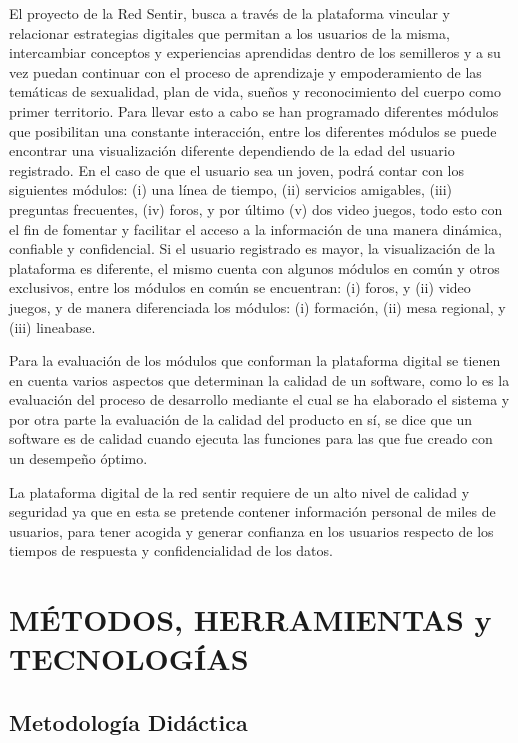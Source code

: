 \documentclass[journal,transmag]{IEEEtran}
\begin{document}
El proyecto de la Red Sentir, busca a través de la plataforma vincular y relacionar estrategias digitales que permitan a los usuarios de la misma, intercambiar conceptos y experiencias aprendidas dentro de los semilleros y a su vez puedan continuar con el proceso de aprendizaje y empoderamiento de las temáticas de sexualidad, plan de vida, sueños y reconocimiento del cuerpo como primer territorio. Para llevar esto a cabo se han programado diferentes módulos que posibilitan una constante interacción, entre los diferentes módulos se puede encontrar una visualización diferente dependiendo de la edad del usuario registrado. 
En el caso de que el usuario sea un joven, podrá contar con los siguientes módulos: (i) una línea de tiempo, (ii) servicios amigables, (iii) preguntas frecuentes, (iv) foros, y por último (v) dos video juegos, todo esto con el fin de fomentar y facilitar el acceso a la información de una manera dinámica, confiable y confidencial. Si el usuario registrado es mayor, la visualización de la plataforma es diferente, el mismo cuenta con algunos módulos en común y otros exclusivos, entre los módulos en común se encuentran: (i) foros, y (ii) video juegos, y de manera diferenciada los módulos:  (i) formación, (ii) mesa regional, y (iii) lineabase.

Para la evaluación de los módulos que conforman la plataforma digital se tienen en cuenta varios aspectos que determinan la calidad de un software, como lo es la evaluación del proceso de desarrollo mediante el cual se ha elaborado el sistema y por otra parte la evaluación de la calidad del producto en sí, se dice que un software es de calidad cuando ejecuta las funciones para las que fue creado con un desempeño óptimo.

La plataforma digital de la red sentir requiere de un alto nivel de calidad y seguridad ya que en esta se pretende contener información personal de miles de usuarios, para tener acogida y generar confianza en los usuarios respecto de los tiempos de respuesta y confidencialidad de los datos.

\section{MÉTODOS, HERRAMIENTAS y TECNOLOGÍAS}\label{sec:herramientas}

\subsection{Metodología Didáctica}
\end{document}
